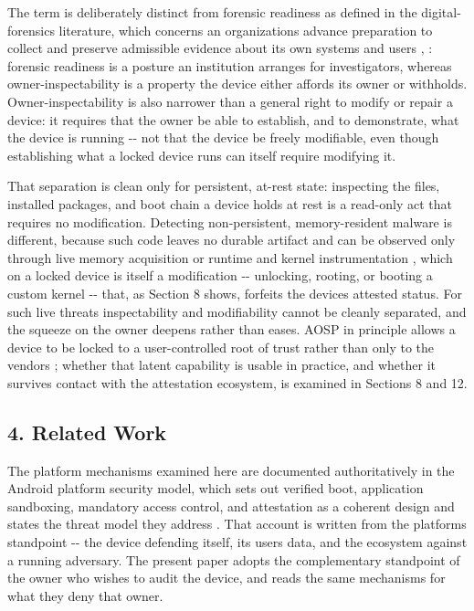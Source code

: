 \documentclass[
]{article}
\begin{document}
The term is deliberately distinct from forensic readiness as defined in
the digital-forensics literature, which concerns an
organization\textquotesingle s advance preparation to collect and
preserve admissible evidence about its own systems and users
\citep{rowlingson-forensic-readiness}, \citep{iso-27043}: forensic
readiness is a posture an institution arranges for investigators,
whereas owner-inspectability is a property the device either affords its
owner or withholds. Owner-inspectability is also narrower than a general
right to modify or repair a device: it requires that the owner be able
to establish, and to demonstrate, what the device is running -\/- not
that the device be freely modifiable, even though establishing what a
locked device runs can itself require modifying it.

That separation is clean only for persistent, at-rest state: inspecting
the files, installed packages, and boot chain a device holds at rest is
a read-only act that requires no modification. Detecting non-persistent,
memory-resident malware is different, because such code leaves no
durable artifact and can be observed only through live memory
acquisition or runtime and kernel instrumentation
\citep{sudhakar-fileless-malware}, which on a locked device is itself a
modification -\/- unlocking, rooting, or booting a custom kernel
\citep{yang-live-memory-acquisition} -\/- that, as Section 8 shows,
forfeits the device\textquotesingle s attested status. For such live
threats inspectability and modifiability cannot be cleanly separated,
and the squeeze on the owner deepens rather than eases. AOSP in
principle allows a device to be locked to a user-controlled root of
trust rather than only to the vendor\textquotesingle s
\citep{aosp-verified-boot}; whether that latent capability is usable in
practice, and whether it survives contact with the attestation
ecosystem, is examined in Sections 8 and 12.

\subsection{4. Related Work}\label{related-work}

The platform mechanisms examined here are documented authoritatively in
the Android platform security model, which sets out verified boot,
application sandboxing, mandatory access control, and attestation as a
coherent design and states the threat model they address
\citep{mayrhofer-android-security-model}. That account is written from
the platform\textquotesingle s standpoint -\/- the device defending
itself, its users\textquotesingle{} data, and the ecosystem against a
running adversary. The present paper adopts the complementary standpoint
of the owner who wishes to audit the device, and reads the same
mechanisms for what they deny that owner.
\end{document}
